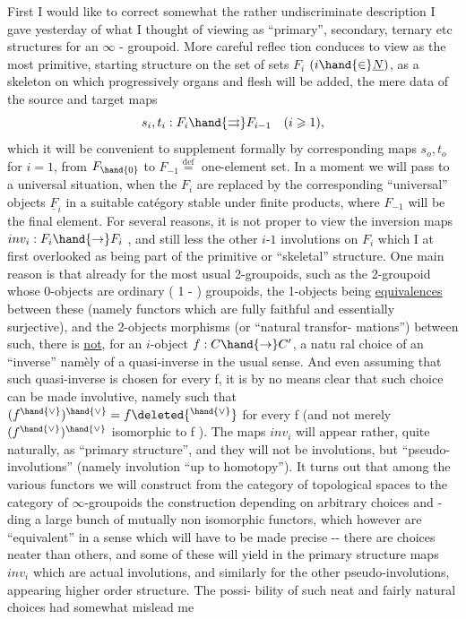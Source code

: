  First I would like to correct somewhat the rather undiscriminate
description I gave yesterday of what I thought of viewing as ``primary'',
secondary, ternary etc structures for an $\infty$ - groupoid. More careful reflec%
\hand{-}tion conduces to view as the most primitive, starting structure on the
set of sets $F_i$ $(i\hand{\in}\underline{N})$, as a skeleton on which progressively organs and
flesh will be added, the mere data of the source and target maps
\[ s_i, t_i : F_i \hand{\rightrightarrows} F_{i-1} \quad (i \geqslant 1) , \]
which it will be convenient to supplement  formally by corresponding
maps $s_o, t_o$ for $i=1$, from $F_{\hand{0}}$ to $F_{-1} \overset{\mathrm{def}}{=}$ one-element set. In a moment
we will pass to a universal situation, when the $F_i$ are replaced by
the corresponding ``universal'' objects $\underline{F}_i$ in a suitable cat\'egory stable
under finite products, where $F_{-1}$ will be the final element. For several
reasons, it is not proper to view the inversion maps $inv_i : F_i \hand{\to} F_i$ ,
and still less the other $i$-$1$ involutions on $F_i$ which I at first overlooked\hand{,}
as being part of the primitive or ``skeletal'' structure. One main reason
is that already for the most usual 2-groupoids, such as the 2-groupoid
whose 0-objects are ordinary ( 1 - ) groupoids, the 1-objects being
\uline{equivalences} between these (namely functors which are fully faithful and
essentially surjective), and the 2-objects morphisms (or ``natural transfor-%
mations'') between such, there is \uline{not}, for an $i$-object $f : C \hand{\to} C'$, a natu%
\hand{-} ral choice of an ``inverse'' nam\`ely of a quasi-inverse in the usual sense.
And even\hand{,} assuming that such quasi-inverse is chosen for every f, it is by
no means clear that such choice can be made involutive, namely such that
$(f^{\hand{\vee}})^{\hand{\vee}} = f\deleted{^{\hand{\vee}}}$ for every f (and not merely $(f^{\hand{\vee}})^{\hand{\vee}}$ isomorphic to f ). The maps
$inv_i$ will appear rather, quite naturally, as ``primary structure'', and
they will not be involutions, but ``pseudo-involutions'' (namely involution
``up to homotopy''). It turns out that among the various functors  we will
construct\hand{,} from the category of topological spaces to the category of
$\infty$-groupoids\hand{(} the construction depending on arbitrary choices and -%
ding a large bunch of mutually non isomorphic functors, which however are
``equivalent'' in a sense which will have to be made precise -\hand{)}- there are
choices neater than others, and some of these will yield in the primary
structure maps $inv_i$ which are actual involutions, and similarly for the
other pseudo-involutions, appearing   higher order structure. The possi-%
bility of such neat and fairly natural choices had somewhat mislead me

